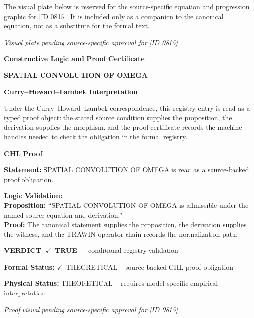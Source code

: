 \begingroup\footnotesize\sloppy
The visual plate below is reserved for the source-specific equation and progression graphic for [ID 0815]. It is included only as a companion to the canonical equation, not as a substitute for the formal text.
\par\endgroup
\begingroup\footnotesize\itshape
Visual plate pending source-specific approval for [ID 0815].
\par\endgroup

\clearpage
\begingroup\tzpsupportsetup
\noindent\textbf{\fontsize{10.8pt}{12.8pt}\selectfont [ID 0815] Constructive Logic and Proof Certificate}\par
\noindent\textbf{\fontsize{10pt}{12pt}\selectfont SPATIAL CONVOLUTION OF OMEGA}\par
\vspace{0.45em}
\begingroup
\footnotesize
\setlength{\parskip}{0.22em}
\setlength{\parindent}{0pt}
\noindent\textbf{Curry--Howard--Lambek Interpretation}\par
Under the Curry--Howard--Lambek correspondence, this registry entry is read as a typed proof
object: the stated source condition supplies the proposition, the derivation supplies the
morphism, and the proof certificate records the machine handles needed to check the obligation
in the formal registry.

\vspace{0.45em}
\noindent\textbf{CHL Proof}\par
\textbf{Statement:} SPATIAL CONVOLUTION OF OMEGA is read as a source-backed proof obligation.

\textbf{Logic Validation:}\\
\textbf{Proposition:} ``SPATIAL CONVOLUTION OF OMEGA is admissible under the named source equation and derivation.''\\
\textbf{Proof:} The canonical statement supplies the proposition, the derivation supplies the witness, and the TRAWIN operator chain records the normalization path.

\textbf{VERDICT:} \ensuremath{\checkmark}\ \textbf{TRUE} --- conditional registry validation

\textbf{Formal Status:} \ensuremath{\checkmark}\ THEORETICAL -- source-backed CHL proof obligation

\textbf{Physical Status:} THEORETICAL -- requires model-specific empirical interpretation
\par\vspace{0.45em}
\par
\vfill
\begingroup\footnotesize\itshape
Proof visual pending source-specific approval for [ID 0815].
\par\endgroup
\vfill
\endgroup
\endgroup
